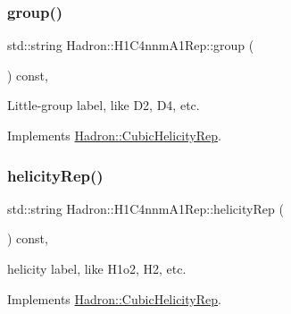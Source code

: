 \mbox{\label{structHadron_1_1H1C4nnmA1Rep_ac58ca1a17658ee7043603fb04a470665}} 
\subsubsection{\texorpdfstring{group()}{group()}\hspace{0.1cm}{\footnotesize\ttfamily [5/5]}}
{\footnotesize\ttfamily std\+::string Hadron\+::\+H1\+C4nnm\+A1\+Rep\+::group (\begin{DoxyParamCaption}{ }\end{DoxyParamCaption}) const\hspace{0.3cm}{\ttfamily [inline]}, {\ttfamily [virtual]}}

Little-\/group label, like D2, D4, etc. 

Implements \mbox{\hyperlink{structHadron_1_1CubicHelicityRep_a101a7d76cd8ccdad0f272db44b766113}{Hadron\+::\+Cubic\+Helicity\+Rep}}.

\mbox{\label{structHadron_1_1H1C4nnmA1Rep_a1ef14b37ee0380d3c1dbc261b412772d}} 
\subsubsection{\texorpdfstring{helicityRep()}{helicityRep()}\hspace{0.1cm}{\footnotesize\ttfamily [1/3]}}
{\footnotesize\ttfamily std\+::string Hadron\+::\+H1\+C4nnm\+A1\+Rep\+::helicity\+Rep (\begin{DoxyParamCaption}{ }\end{DoxyParamCaption}) const\hspace{0.3cm}{\ttfamily [inline]}, {\ttfamily [virtual]}}

helicity label, like H1o2, H2, etc. 

Implements \mbox{\hyperlink{structHadron_1_1CubicHelicityRep_af1096946b7470edf0a55451cc662f231}{Hadron\+::\+Cubic\+Helicity\+Rep}}.

\mbox{\label{structHadron_1_1H1C4nnmA1Rep_a1ef14b37ee0380d3c1dbc261b412772d}} 
